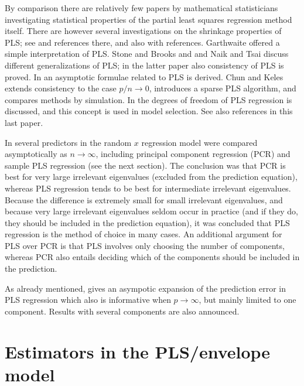 \documentclass[num-refs]{wiley-article}
\begin{document}
By comparison there are relatively few papers by mathematical statisticians
investigating statistical properties of the partial least squares regression
method itself. There are however several investigations on the shrinkage
properties of PLS; see \citet{kramer2007overview} and references there, and also \citet{foschigeometry} with references. Garthwaite \citet{garthwaite1994interpretation} offered a simple interpretation of PLS. Stone and Brooks \citet{stone1990continuum} and  and Naik and Tsai\citet{naik2000partial} discuss different generalizations of PLS; in the latter paper also consistency of PLS is proved. In  \citet{stoica1998partial} an asymptotic formulae related to PLS is derived. Chun and Keles \citet{chun2010sparse} extends consistency to the case $p/n\rightarrow 0$, introduces a sparse PLS algorithm, and compares methods by simulation. In \citet{kramer2012degrees} the degrees of freedom of PLS regression is discussed, and this concept is used in model selection. See also references in this last paper.

In \citet{helland1994comparison} several predictors in the random $x$ regression model were compared asymptotically as $n\rightarrow\infty$, including principal component regression (PCR) and sample PLS regression (see the next section). The conclusion was that PCR is best for very large irrelevant eigenvalues (excluded from the prediction equation), whereas PLS regression tends to be best for intermediate irrelevant eigenvalues. Because the difference is extremely small for small irrelevant eigenvalues, and because very large irrelevant eigenvalues seldom occur in practice (and if they do, they should be included in the prediction equation), it was concluded that PLS regression is the method of choice in many cases. An additional argument for PLS over PCR is that PLS involves only choosing the number of components, whereas PCR also entails deciding which of the components should be included in the prediction.

As already mentioned, \citet{cook2017pls} gives an asympotic expansion of the prediction error in PLS regression which also is informative when $p\rightarrow\infty$, but mainly limited to one component. Results with several components are also announced.

\bigskip

\section{Estimators in the PLS/envelope model}
\end{document}
